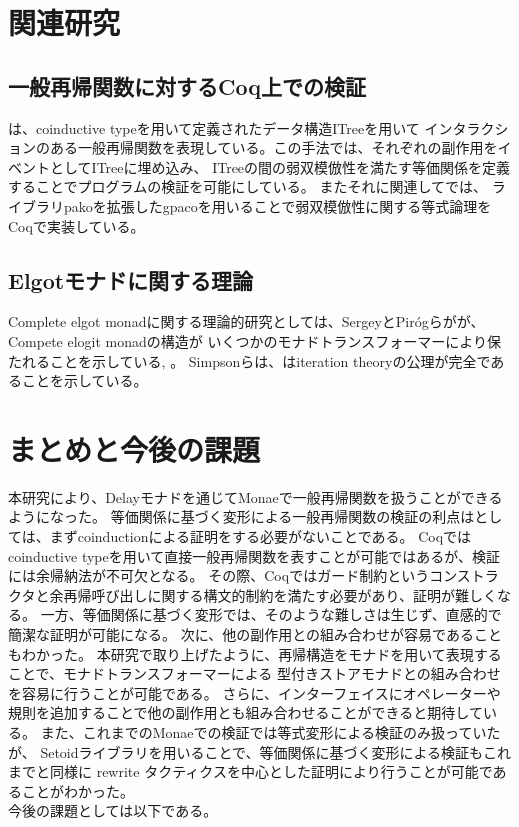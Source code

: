 \documentclass[japanese]{jssst_ppl}
\theoremstyle{definition}
\begin{document}
\section{関連研究}
\subsection{一般再帰関数に対するCoq上での検証}
\cite{10.1145/3371119}は、coinductive typeを用いて定義されたデータ構造ITreeを用いて
インタラクションのある一般再帰関数を表現している。この手法では、それぞれの副作用をイベントとしてITreeに埋め込み、
ITreeの間の弱双模倣性を満たす等価関係を定義することでプログラムの検証を可能にしている。
またそれに関連して\cite{10.1145/3372885.3373813}では、
ライブラリpakoを拡張したgpacoを用いることで弱双模倣性に関する等式論理をCoqで実装している。

\subsection{Elgotモナドに関する理論}
Complete elgot monadに関する理論的研究としては、SergeyとPirógらがが、Compete elogit monadの構造が
いくつかのモナドトランスフォーマーにより保たれることを示している\cite{GONCHAROV2015183}, \cite{PIROG2014273}。
Simpsonらは、はiteration theoryの公理が完全であることを示している\cite{cacmfpo}。

\section{まとめと今後の課題}
本研究により、Delayモナドを通じてMonaeで一般再帰関数を扱うことができるようになった。
等価関係に基づく変形による一般再帰関数の検証の利点はとしては、まずcoinductionによる証明をする必要がないことである。
Coqではcoinductive typeを用いて直接一般再帰関数を表すことが可能ではあるが、検証には余帰納法が不可欠となる。
その際、Coqではガード制約というコンストラクタと余再帰呼び出しに関する構文的制約を満たす必要があり、証明が難しくなる。
一方、等価関係に基づく変形では、そのような難しさは生じず、直感的で簡潔な証明が可能になる。
次に、他の副作用との組み合わせが容易であることもわかった。
本研究で取り上げたように、再帰構造をモナドを用いて表現することで、モナドトランスフォーマーによる
型付きストアモナドとの組み合わせを容易に行うことが可能である。
さらに、インターフェイスにオペレーターや規則を追加することで他の副作用とも組み合わせることができると期待している。
また、これまでのMonaeでの検証では等式変形による検証のみ扱っていたが、
Setoidライブラリを用いることで、等価関係に基づく変形による検証もこれまでと同様に
rewrite タクティクスを中心とした証明により行うことが可能であることがわかった。\\
今後の課題としては以下である。
\end{document}
